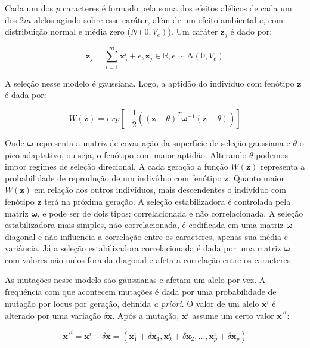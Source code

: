 Cada um dos $p$ caracteres é formado pela soma dos efeitos alélicos de
cada um dos $2m$ alelos agindo sobre esse caráter, além de um efeito
ambiental $e$, com distribuição normal e média zero ($N(0,V_e)$).
Um caráter $\mathbf{z}_j$ é dado
por:

\begin{equation}
    \mathbf{z}_j = \sum_{i=1}^m \mathbf{x}^i_j + e, \mathbf{z}_j \in \mathbb{R}, e \sim N(0, V_e)
\end{equation}

A seleção nesse modelo é gaussiana.
Logo, a aptidão do indivíduo com fenótipo $\mathbf{z}$ é dada por:

\begin{equation}
W(\mathbf{z}) = exp \left[-\frac{1}{2} ((\mathbf{z}-\theta)^T \pmb{\omega}^{-1} (\mathbf{z}-\theta))\right] 
\label{selecao}
\end{equation}

Onde $\pmb{\omega}$ representa a matriz de covariação da superfície de seleção
gaussiana e $\theta$ o pico adaptativo, ou seja, o fenótipo com maior
aptidão.
Alterando $\theta$ podemos impor regimes de seleção direcional.
A cada geração a função $W(\mathbf{z})$ representa a probabilidade de reprodução
de um indivíduo com fenótipo $\mathbf{z}$.
Quanto maior $W(\mathbf{z})$ em relação aos outros indivíduos, mais descendentes
o indivíduo com fenótipo $\mathbf{z}$ terá na próxima geração.
A seleção estabilizadora é controlada pela matriz $\pmb{\omega}$, e
pode ser de dois tipos: correlacionada e não correlacionada.
A seleção estabilizadora mais simples, não correlacionada, é codificada
em uma matriz $\pmb{\omega}$ diagonal e não influencia a correlação entre os
caracteres, apenas sua média e variância.
Já a seleção estabilizadora correlacionada é dada por uma matriz
$\pmb{\omega}$ com valores não nulos fora da diagonal e afeta a correlação
entre os caracteres.

As mutações nesse modelo são gaussianas e afetam um alelo por vez.
A frequência com que acontecem mutações é dada por uma probabilidade de
mutação por locus por geração, definida {\it a priori}.
O valor de um alelo $\mathbf{x}^i$ é alterado por uma variação $ \delta \mathbf{x}$.
Após a mutação, $\mathbf{x}^i$ assume um certo valor $\mathbf{x}'^i$:

\begin{equation}
\mathbf{x}'^i = \mathbf{x}^i + \delta \mathbf{x} = ( \mathbf{x}^i_1 + \delta \mathbf{x}_1, \mathbf{x}^i_2 + \delta \mathbf{x}_2,\ldots, \mathbf{x}^i_p + \delta \mathbf{x}_p)
\end{equation}

